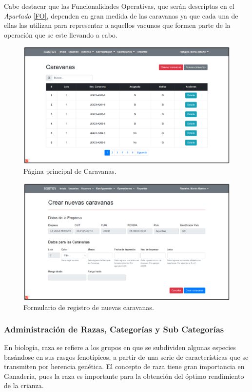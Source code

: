 \documentclass[11pt,oneside]{book}
\begin{document}
Cabe destacar que las Funcionalidades Operativas, que serán descriptas en el \textit{Apartado} \eqref{FO}, dependen en gran medida de las caravanas ya que cada una de ellas las utilizan para representar a aquellos vacunos que formen parte de la operación que se este llevando a cabo.

\begin{figure}[tbhp]
\centerline{\includegraphics[scale=0.87]{figs/capitulo_3_desarrollo/fig412.pdf}}
\caption{Página principal de Caravanas.}
\label{fig412}
\end{figure}

\begin{figure}[tbhp]
\centerline{\includegraphics[scale=0.87]{figs/capitulo_3_desarrollo/fig413.pdf}}
\caption{Formulario de registro de nuevas caravanas.}
\label{fig413}
\end{figure}

\subsubsection{Administración de Razas, Categorías y Sub Categorías}
En biología, raza se refiere a los grupos en que se subdividen algunas especies basándose en sus rasgos fenotípicos, a partir de una serie de características que se transmiten por herencia genética. El concepto de raza tiene gran importancia en Ganadería, pues la raza es importante para la obtención del óptimo rendimiento de la crianza.
\end{document}
